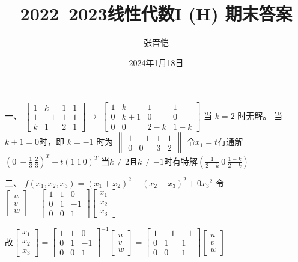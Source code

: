 \documentclass[UTF8]{article}
\title{2022~2023线性代数I (H) 期末答案 }
\author{张晋恺}
\date{2024年1月18日}
\begin{document}
\maketitle
    
 一、
     $\begin{bmatrix}  1&k&1&1\\1&-1&1&1\\k&1&2&1  \end{bmatrix}\rightarrow$ 
     $\begin{bmatrix}  1&k&1&1\\0&k+1&0&0\\0&0&2-k&1-k  \end{bmatrix}$
     当 $k=2$ 时无解。
     当$k+1=0$时，即
     $k=-1$
     时为
     $\begin{Vmatrix}  1&-1&1&1\\0&0&3&2  \end{Vmatrix}$
     令$x_1=t$有通解${(0 \ -\frac{1}{3} \ \frac{2}{3})}^T+t{(1 \ 1 \ 0)}^T$
     当$k\neq 2$且$k\neq -1$时有特解$(\frac{1}{2-k} \ 0  \ \frac{1-k}{2-k})$
\par
二、
     $f(x_1,x_2,x_3)={(x_1+x_2)}^2-{(x_2-x_3)}^2+0{x_3}^2$
     令$\begin{bmatrix}u\\v\\w\end{bmatrix}= 
     \begin{bmatrix}1&1&0\\0&1&-1\\0&0&1\end{bmatrix}\begin{bmatrix}x_1\\x_2\\x_3\end{bmatrix}$
     \par
     故$\begin{bmatrix}x_1\\x_2\\x_3\end{bmatrix}= {\begin{bmatrix}1&1&0\\0&1&-1\\0&0&1\end{bmatrix}}^{-1}\begin{bmatrix}u\\v\\w\end{bmatrix}
     ={\begin{bmatrix}1&-1&-1\\0&1&1\\0&0&1\end{bmatrix}}\begin{bmatrix}u\\v\\w\end{bmatrix}$
\end{document}
